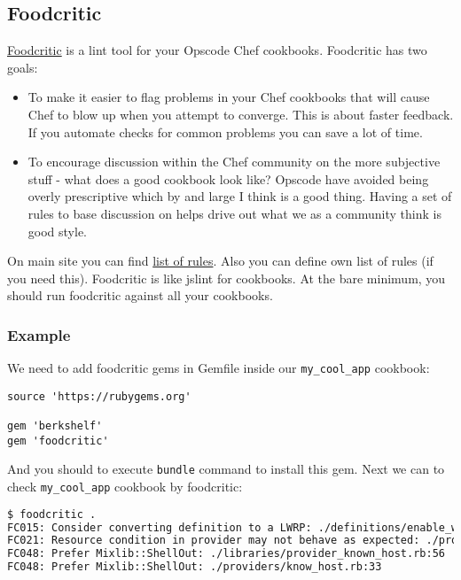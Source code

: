 \subsection{Foodcritic}

\href{http://www.foodcritic.io/}{Foodcritic} is a lint tool for your Opscode Chef cookbooks. Foodcritic has two goals:

\begin{itemize}
  \item To make it easier to flag problems in your Chef cookbooks that will cause Chef to blow up when you attempt to converge. This is about faster feedback. If you automate checks for common problems you can save a lot of time.
  \item To encourage discussion within the Chef community on the more subjective stuff - what does a good cookbook look like? Opscode have avoided being overly prescriptive which by and large I think is a good thing. Having a set of rules to base discussion on helps drive out what we as a community think is good style.
\end{itemize}

On main site you can find \href{http://www.foodcritic.io/}{list of rules}. Also you can define own list of rules (if you need this). Foodcritic is like jslint for cookbooks. At the bare minimum, you should run foodcritic against all your cookbooks.

\subsubsection{Example}

We need to add foodcritic gems in Gemfile inside our \lstinline!my_cool_app! cookbook:

\begin{lstlisting}[label=lst:testing-foodcritic1]
source 'https://rubygems.org'

gem 'berkshelf'
gem 'foodcritic'
\end{lstlisting}

And you should to execute \lstinline!bundle! command to install this gem. Next we can to check \lstinline!my_cool_app! cookbook by foodcritic:

\begin{lstlisting}[language=Bash,label=lst:testing-foodcritic2]
$ foodcritic .
FC015: Consider converting definition to a LWRP: ./definitions/enable_web_site.rb:1
FC021: Resource condition in provider may not behave as expected: ./providers/know_host.rb:39
FC048: Prefer Mixlib::ShellOut: ./libraries/provider_known_host.rb:56
FC048: Prefer Mixlib::ShellOut: ./providers/know_host.rb:33
\end{lstlisting}


